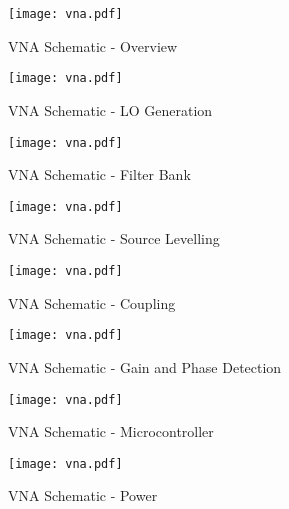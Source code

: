 \begin{landscape}
	\begin{figure}
		\centering
		\texttt{[image: vna.pdf]}
		\caption{VNA Schematic - Overview}
		\label{fig:vna_schematic_overview}
	\end{figure}

	\begin{figure}
		\centering
		\texttt{[image: vna.pdf]}
		\caption{VNA Schematic - LO Generation}
		\label{fig:vna_schematic_lo}
	\end{figure}
	
	\begin{figure}
		\centering
		\texttt{[image: vna.pdf]}
		\caption{VNA Schematic - Filter Bank}
		\label{fig:vna_schematic_filter}
	\end{figure}
	
	\begin{figure}
		\centering
		\texttt{[image: vna.pdf]}
		\caption{VNA Schematic - Source Levelling}
		\label{fig:vna_schematic_source_levelling}
	\end{figure}
	
	\begin{figure}
		\centering
		\texttt{[image: vna.pdf]}
		\caption{VNA Schematic - Coupling}
		\label{fig:vna_schematic_coupling}
	\end{figure}
	
	\begin{figure}
		\centering
		\texttt{[image: vna.pdf]}
		\caption{VNA Schematic - Gain and Phase Detection}
		\label{fig:vna_schematic_ad8302}
	\end{figure}
	
	\begin{figure}
		\centering
		\texttt{[image: vna.pdf]}
		\caption{VNA Schematic - Microcontroller}
		\label{fig:vna_schematic_micro}
	\end{figure}
	
	\begin{figure}
		\centering
		\texttt{[image: vna.pdf]}
		\caption{VNA Schematic - Power}
		\label{fig:vna_schematic_power}
	\end{figure}
\end{landscape}
